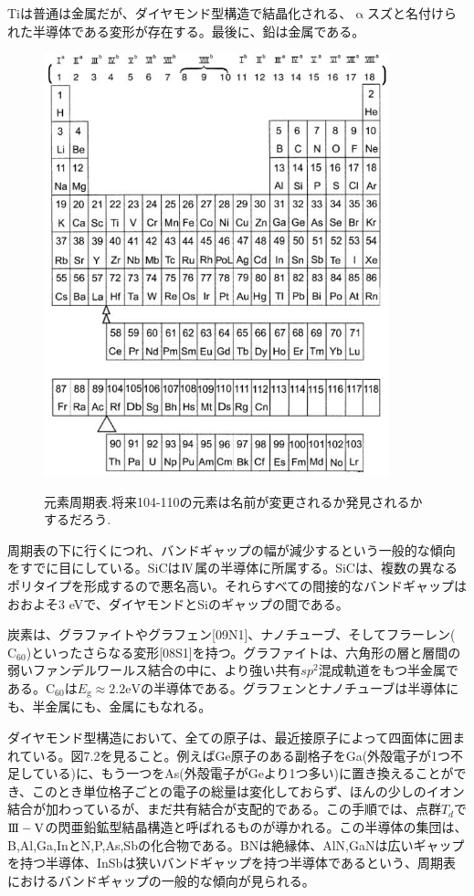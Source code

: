 \documentclass[11pt,a4j,uplatex]{jsarticle}
\begin{document}
Tiは普通は金属だが、ダイヤモンド型構造で結晶化される、$\upalpha$スズと名付けられた半導体である変形が存在する。最後に、鉛は金属である。

\renewcommand{\figurename}{表}
\begin{figure}[tb]
  \centering
  \caption{元素周期表.将来104-110の元素は名前が変更されるか発見されるかするだろう.}
  \includegraphics[clip,width=10cm]{8_1.JPG}
  \label{table8.1}
\end{figure}

周期表の下に行くにつれ、バンドギャップの幅が減少するという一般的な傾向をすでに目にしている。SiCは$\mathrm{I\hspace{-1pt}V}$属の半導体に所属する。SiCは、複数の異なるポリタイプを形成するので悪名高い。それらすべての間接的なバンドギャップはおおよそ3 eVで、ダイヤモンドとSiのギャップの間である。

炭素は、グラファイトやグラフェン[09N1]、ナノチューブ、そしてフラーレン($\mathrm{C_{60}}$)といったさらなる変形[08S1]を持つ。グラファイトは、六角形の層と層間の弱いファンデルワールス結合の中に、より強い共有$sp^2$混成軌道をもつ半金属である。$\mathrm{C_{60}}$は$E_{\mathrm{g}}\approx2.2 \mathrm{eV}$の半導体である。グラフェンとナノチューブは半導体にも、半金属にも、金属にもなれる。

ダイヤモンド型構造において、全ての原子は、最近接原子によって四面体に囲まれている。図7.2を見ること。例えばGe原子のある副格子をGa(外殻電子が1つ不足している)に、もう一つをAs(外殻電子がGeより1つ多い)に置き換えることができ、このとき単位格子ごとの電子の総量は変化しておらず、ほんの少しのイオン結合が加わっているが、まだ共有結合が支配的である。この手順では、点群$T_d$で$\mathrm{I\hspace{-1pt}I\hspace{-1pt}I-V}$の閃亜鉛鉱型結晶構造と呼ばれるものが導かれる。この半導体の集団は、B,Al,Ga,InとN,P,As,Sbの化合物である。BNは絶縁体、AlN,GaNは広いギャップを持つ半導体、InSbは狭いバンドギャップを持つ半導体であるという、周期表におけるバンドギャップの一般的な傾向が見られる。
\end{document}
